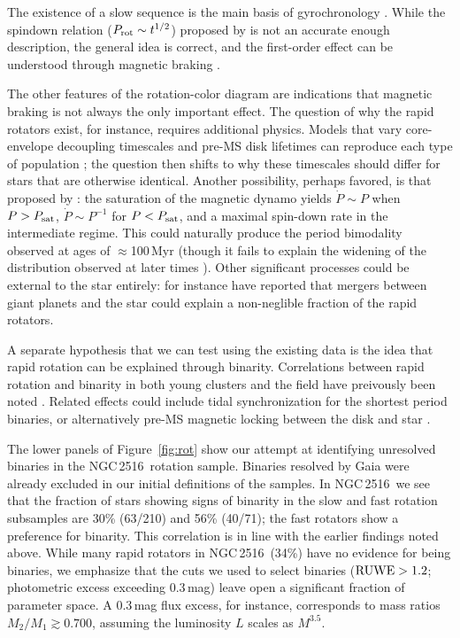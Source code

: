 \documentclass[12pt,twocolumn,tighten]{aastex63}
\newcommand{\cn}{NGC\,2516} %
\begin{document}
The existence of a slow sequence is the main basis of gyrochronology
\citep[{\it e.g.},][]{barnes_rotational_2003}.  While the 
spindown relation ($P_{\rm rot}\sim t^{1/2}$) proposed by
\citet{skumanich_time_1972} is not an accurate enough description, the
general idea is correct, and the first-order effect can be understood
through magnetic braking \citep{weber_angular_1967}.

The other features of the rotation-color diagram are indications that
magnetic braking is not always the only important effect.  The
question of why the rapid rotators exist, for instance, requires
additional physics.  Models that vary core-envelope decoupling
timescales and pre-MS disk lifetimes can reproduce each type of
population
\citep{Irwin_NGC2516_2007,gallet_improved_2013,gallet_improved_2015};
the question then shifts to why these timescales should differ for
stars that are otherwise identical.  Another possibility, perhaps
favored, is that proposed by \citet{matt_mass-dependence_2015}: the
saturation of the magnetic dynamo yields $\dot{P}\sim P$ when $P >
P_{\rm sat}$, $\dot{P} \sim P^{-1}$ for $P < P_{\rm sat}$, and a
maximal spin-down rate in the intermediate regime.  This could
naturally produce the period bimodality observed at ages of
$\approx$100\,Myr (though it fails to explain the widening of the
distribution observed at later times
\citealt{godoyrivera_stellar_2021}).  Other significant processes
could be external to the star entirely: \citet{qureshi_signature_2018}
for instance have reported that mergers between giant planets and the
star could explain a non-neglible fraction of the rapid rotators.

A separate hypothesis that we can test using the existing data is the
idea that rapid rotation can be explained through binarity.
Correlations between rapid rotation and binarity in both young
clusters and the field have preivously been noted
\citep{meibom_effect_2007,stauffer_rotation_2016,simonian_rapid_2019,gillen_ngts_2020}.
Related effects could include tidal synchronization for the shortest
period binaries, or alternatively pre-MS magnetic locking between the
disk and star \citep[{\it
e.g.},][]{koenigl_disk_1991,long_locking_2005}.

The lower panels of Figure~\ref{fig:rot} show our attempt at
identifying unresolved binaries in the \cn\ rotation sample.  Binaries
resolved by Gaia were already excluded in our initial definitions of
the samples.  In \cn\, we see that the fraction of stars showing signs
of binarity in the slow and fast rotation subsamples are 30\% (63/210)
and 56\% (40/71); the fast rotators show a preference for binarity.
This correlation is in line with the earlier findings noted above.
While many rapid rotators in \cn\ (34\%) have no evidence for being
binaries, we emphasize that the cuts we used to select binaries (${\rm
RUWE}>1.2$; photometric excess exceeding 0.3\,mag) leave open a
significant fraction of parameter space.  A 0.3\,mag flux excess, for
instance, corresponds to mass ratios $M_2/M_1 \gtrsim 0.700$, assuming
the luminosity $L$ scales as $M^{3.5}$. 
\end{document}
